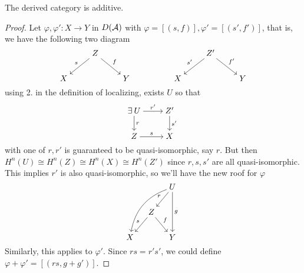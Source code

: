 \begin{prop}
  The derived category is additive.
  \begin{proof}
    Let $\varphi, \varphi' : X \to Y$ in $D(\mathcal{A})$ with
    $\varphi = [(s, f)], \varphi' = [(s', f')]$, that is, we have the following two diagram
    \[ \begin{tikzcd}[cramped]
        & Z \ar[ld, "s"'] \ar[rd, "f"] & & & & Z' \ar[ld, "s'"'] \ar[rd, "f'"] & \\
        X &   & Y & & X & & Y 
      \end{tikzcd} \]
    using 2. in the definition of localizing,
    exists $U$ so that
    \[ \begin{tikzcd}[cramped]
        \exists U \ar[r, "r'"] \ar[d, "r"] & Z' \ar[d, "s'"] \\
        Z \ar[r, "s"] & X
      \end{tikzcd} \]
    with one of $r, r'$ is guaranteed to be quasi-isomorphic, say $r$.
    But then $H^n(U) \cong H^n(Z) \cong H^n(X) \cong H^n(Z')$
    since $r, s, s'$ are all quasi-isomorphic. This implies $r'$
    is also quasi-isomorphic, so we'll have the new roof for $\varphi$
    \[ \begin{tikzcd}[cramped, column sep=small]
        & & U \ar[ld, "r"'] \ar[lldd, bend right] \ar[dd, "g"] \\
        & Z \ar[ld, "s"'] \ar[rd, "f"] & \\
        X & & Y
      \end{tikzcd} \]
    Similarly, this applies to $\varphi'$. Since $rs = r's'$, we could
    define $\varphi + \varphi' = [(rs, g+g')]$.
  \end{proof}
\end{prop}

